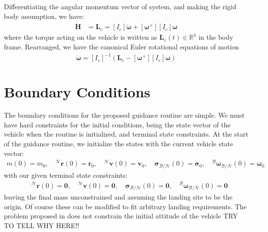 Differentiating the angular momentum vector of system, and making the rigid body assumption, we have:
\begin{align}
\dot{\bm{H}} &= \mathbf{L}_c = [I_c]\dot{\boldsymbol{\omega}} + [\boldsymbol{\omega}^\times][I_c]\boldsymbol{\omega}
\end{align}
where the torque acting on the vehicle is written as $\mathbf{L}_c(t) \in \mathbb{R}^3$ in the body frame. Rearranged, we have the canonical Euler rotational equations of motion
\begin{align}
	\dot{\boldsymbol{\omega}} = [I_c]^{-1}(\mathbf{L}_c - [\boldsymbol{\omega}^\times][I_c]\boldsymbol{\omega})
\end{align}


\section{Boundary Conditions}
The boundary conditions for the proposed guidance routine are simple. We must have hard constraints for the initial conditions, being the state vector of the vehicle when the routine is initialized, and terminal state constraints. At the start of the guidance routine, we initialize the states with the current vehicle state vector:
\begin{align}
	m(0) = m_0, \quad ^\mathcal{N}\mathbf{r}(0) = \mathbf{r}_0, \quad ^\mathcal{N}\mathbf{v}(0) = \mathbf{v}_0, \quad \boldsymbol{\sigma}_\mathcal{B/N}(0) = \boldsymbol{\sigma}_0, \quad  ^\mathcal{B}\boldsymbol{\omega}_\mathcal{B/N}(0) = \boldsymbol{\omega}_0
\end{align}
with our given terminal state constraints:
\begin{align}
	\quad ^\mathcal{N}\mathbf{r}(0) = \mathbf{0}, \quad ^\mathcal{N}\mathbf{v}(0) = \mathbf{0}, \quad \boldsymbol{\sigma}_\mathcal{B/N}(0) = \mathbf{0}, \quad  ^\mathcal{B}\boldsymbol{\omega}_\mathcal{B/N}(0) = \mathbf{0}
\end{align}
leaving the final mass unconstrained and assuming the landing site to be the origin. Of course these can be modified to fit arbitrary landing requirements. The problem proposed in \cite{szmuk2018successive} does not constrain the initial attitude of the vehicle TRY TO TELL WHY HERE!!

